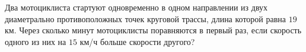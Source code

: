 \begin{ex}
	\begin{condition}
		Два мотоциклиста стартуют одновременно в одном направлении из двух диаметрально противоположных точек круговой трассы, длина которой равна \( 19  \)км. Через сколько минут мотоциклисты поравняются в первый раз, если скорость одного из них на \( 15  \) км/ч больше скорости другого?
	\end{condition}
\end{ex}